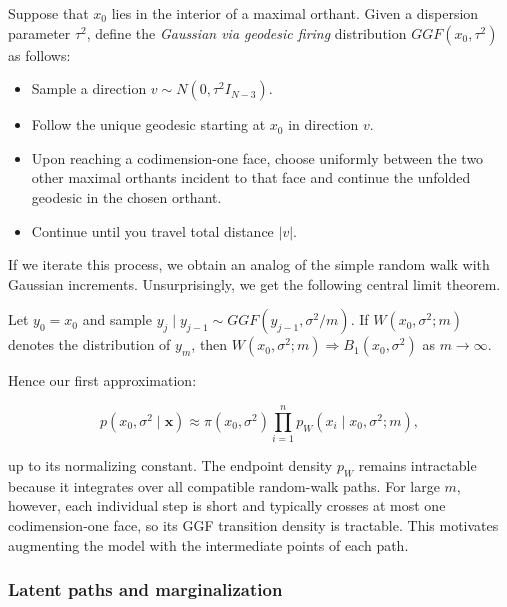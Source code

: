 Suppose that $x_0$ lies in the interior of a maximal orthant. Given a
dispersion parameter $\tau^2$, define the \textit{Gaussian via geodesic firing}
distribution $GGF(x_0,\tau^2)$ as follows:

\begin{itemize}
    \item Sample a direction $v \sim N(0, \tau^2 I_{N-3})$. 
    
    \item Follow the unique geodesic starting at $x_0$ in direction $v$. 

    \item Upon reaching a codimension-one face, choose uniformly between the
    two other maximal orthants incident to that face and continue the unfolded
    geodesic in the chosen orthant.

    \item Continue until you travel total distance $|v|$.
\end{itemize}

\noindent If we iterate this process, we obtain an analog of the simple random walk with Gaussian increments. Unsurprisingly, we get the following central limit theorem.

\begin{lem}
    Let $y_0=x_0$ and sample
    $y_j\mid y_{j-1}\sim GGF(y_{j-1},\sigma^2/m)$. If
    $W(x_0,\sigma^2;m)$ denotes the distribution of $y_m$, then
    $W(x_0,\sigma^2;m)\Rightarrow B_1(x_0,\sigma^2)$ as $m\to\infty$.
\end{lem}

\noindent Hence our first approximation:

\[
  p(x_0,\sigma^2\mid\mathbf{x})
  \approx \pi(x_0,\sigma^2)
  \prod_{i=1}^n p_W(x_i\mid x_0,\sigma^2;m),
\]

\noindent up to its normalizing constant. The endpoint density $p_W$ remains
intractable because it integrates over all compatible random-walk paths. For
large $m$, however, each individual step is short and typically crosses at most
one codimension-one face, so its GGF transition density is tractable. This
motivates augmenting the model with the intermediate points of each path.

\subsubsection{Latent paths and marginalization}

